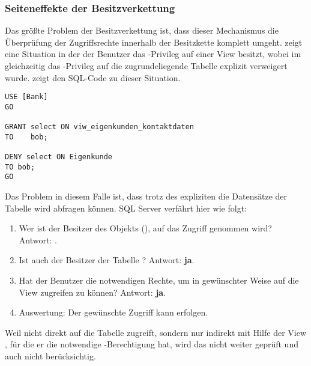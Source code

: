         \subsubsection{Seiteneffekte der Besitzverkettung}
          Das größte Problem der Besitzverkettung ist, dass dieser Mechanismus
          die Überprüfung der Zugriffsrechte innerhalb der Besitzkette komplett
          umgeht.
           zeigt eine Situation in
          der der Benutzer  das -Privileg auf
          einer View besitzt, wobei im gleichzeitig das -Privileg auf die
          zugrundeliegende Tabelle explizit verweigert wurde.
           zeigt den SQL-Code zu dieser Situation.
          \begin{lstlisting}[language=ms_sql,caption={Seiteneffekte der Besitzverkettung},label=sql19_25]
USE [Bank]
GO

GRANT select ON viw_eigenkunden_kontaktdaten
TO    bob;

DENY select ON Eigenkunde
TO bob;
GO
          \end{lstlisting}
          Das Problem in diesem Falle ist, dass  trotz des
          expliziten  die Datensätze der Tabelle
           wird abfragen können. SQL Server verfährt hier
          wie folgt:
          \begin{enumerate}
            \item Wer ist der Besitzer des Objekts
            (), auf das Zugriff
            genommen wird? Antwort: .
            \item Ist  auch der Besitzer der Tabelle
            ? Antwort: \textbf{ja}.
            \item Hat der Benutzer  die notwendigen Rechte, um
            in gewünschter Weise auf die
            View  zugreifen zu können?
            Antwort: \textbf{ja}.
            \item Auswertung: Der gewünschte Zugriff kann erfolgen.
          \end{enumerate}
          Weil  nicht direkt auf die Tabelle
           zugreift, sondern nur indirekt mit Hilfe der
          View , für die er die
          notwendige -Berechtigung hat, wird das
           nicht weiter geprüft und auch nicht berücksichtig.
          
